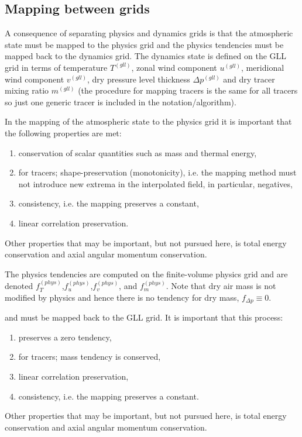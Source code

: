 \subsection{Mapping between grids}
A consequence of separating physics and dynamics grids is that the atmospheric state must be mapped to the physics grid and the physics tendencies must be mapped back to the dynamics grid. The dynamics state is defined on the GLL grid in terms of temperature $T^{(gll)}$, zonal wind component $u^{(gll)}$, meridional wind component $v^{(gll)}$, dry pressure level thickness $\Delta p^{(gll)}$ and dry tracer mixing ratio $m^{(gll)}$ (the procedure for mapping tracers is the same for all tracers so just one generic tracer is included in the notation/algorithm).



In the mapping of the atmospheric state to the physics grid it is important that the following properties are met:
\begin{enumerate}
\item conservation of scalar quantities such as mass and thermal energy,\label{prop1}
\item for tracers; shape-preservation (monotonicity), i.e. the mapping method must not introduce new extrema in the interpolated field, in particular, negatives,\label{prop2}
\item consistency, i.e. the mapping preserves a constant,\label{prop3}
\item linear correlation preservation.
\end{enumerate}
Other properties that may be important, but not pursued here, is total energy conservation and axial angular momentum conservation. 

The physics tendencies are computed on the finite-volume physics grid and are denoted $f_T^{(phys)}$,$f_u^{(phys)}$,$f_v^{(phys)}$, and $f_m^{(phys)}$. Note that dry air mass is not modified by physics and hence there is no tendency for dry mass,  $f_{\Delta p}\equiv 0$.

and must be mapped back to the GLL grid. It is important that this process:
\begin{enumerate}
\item preserves a zero tendency,
\item for tracers; mass tendency is conserved,
\item linear correlation preservation,
\item consistency, i.e. the mapping preserves a constant.
\end{enumerate}
Other properties that may be important, but not pursued here, is total energy conservation and axial angular momentum conservation. 

